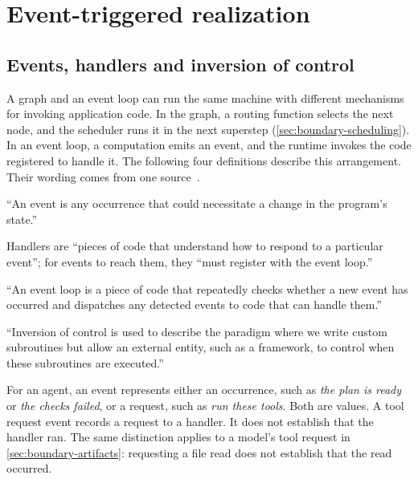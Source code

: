 \section{Event-triggered realization}
\label{sec:events}

\subsection{Events, handlers and inversion of control}
\label{sec:events-ioc}

A graph and an event loop can run the same machine with different mechanisms for invoking
application code. In the graph, a routing function selects the next node, and the scheduler runs it
in the next superstep (\cref{sec:boundary-scheduling}). In an event loop, a computation emits an
event, and the runtime invokes the code registered to handle it. The following four definitions
describe this arrangement. Their wording comes from one source~\citep[Event Handling; Understanding the
Event Loop]{cornell-cs2110-lec25}.

\begin{definition}[Event]
\label{def:event}
``An event is any occurrence that could necessitate a change in the program's state.''
\end{definition}

\begin{definition}[Handler]
\label{def:handler}
Handlers are ``pieces of code that understand how to respond to a particular event''; for events to
reach them, they ``must register with the event loop.''
\end{definition}

\begin{definition}
\label{def:event-loop}
``An event loop is a piece of code that repeatedly checks whether a new event has occurred and
dispatches any detected events to code that can handle them.''
\end{definition}

\begin{definition}
\label{def:inversion-of-control}
``Inversion of control is used to describe the paradigm where we write custom subroutines but allow
an external entity, such as a framework, to control when these subroutines are executed.''
\end{definition}

For an agent, an event represents either an occurrence, such as \emph{the plan is ready} or
\emph{the checks failed}, or a request, such as \emph{run these tools}. Both are values. A tool
request event records a request to a handler. It does not establish that the handler ran. The same
distinction applies to a model's tool request in \cref{sec:boundary-artifacts}: requesting a file
read does not establish that the read occurred.

